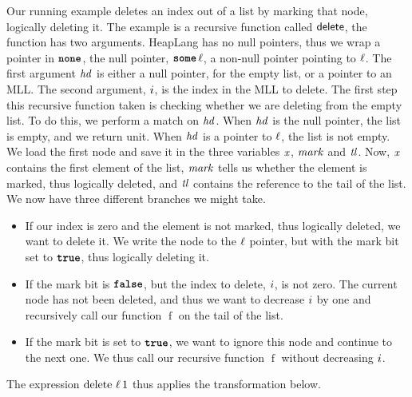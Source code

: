 \documentclass[thesis.tex]{subfiles}
\begin{document}
Our running example deletes an index out of a list by marking that node, logically deleting it.
\MLLDeleteProg
The example is a recursive function called $\textsf{\upshape delete}$, the function has two arguments. HeapLang has no null pointers, thus we wrap a pointer in $\operatorname{\texttt{\upshape \bfseries none}}$, the null pointer, $\operatorname{\texttt{\upshape \bfseries some}} \ell$, a non-null pointer pointing to $\ell$. The first argument $\mathit{hd}$ is either a null pointer, for the empty list, or a pointer to an MLL. The second argument, $i$, is the index in the MLL to delete. The first step this recursive function taken is checking whether we are deleting from the empty list. To do this, we perform a match on $\mathit{hd}$. When $\mathit{hd}$ is the null pointer, the list is empty, and we return unit. When $\mathit{hd}$ is a pointer to $\ell$, the list is not empty. We load the first node and save it in the three variables $\mathit{x}$, $\mathit{mark}$ and $\mathit{tl}$. Now, $\mathit{x}$ contains the first element of the list, $\mathit{mark}$ tells us whether the element is marked, thus logically deleted, and $\mathit{tl}$ contains the reference to the tail of the list. We now have three different branches we might take.
\begin{itemize}
  \item If our index is zero and the element is not marked, thus logically deleted, we want to delete it. We write the node to the $\ell$ pointer, but with the mark bit set to $\texttt{\upshape \bfseries true}$, thus logically deleting it.
  \item If the mark bit is $\texttt{\upshape \bfseries false}$, but the index to delete, $i$, is not zero. The current node has not been deleted, and thus we want to decrease $i$ by one and recursively call our function $\operatorname{f}$ on the tail of the list.
  \item If the mark bit is set to $\texttt{\upshape \bfseries true}$, we want to ignore this node and continue to the next one. We thus call our recursive function $\operatorname{f}$ without decreasing $i$.
\end{itemize}
The expression $\operatorname{delete}\, \ell\, 1$ thus applies the transformation below.
\end{document}
